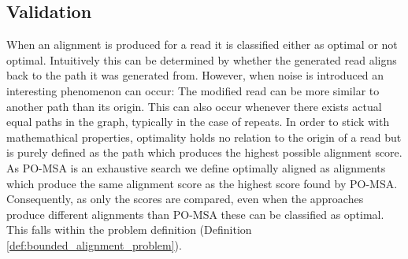 \documentclass[thesis.tex]{subfiles}
\begin{document}
\subsection{Validation}
When an alignment is produced for a read it is classified either as optimal or not optimal. Intuitively this can be determined by whether the generated read aligns back to the path it was generated from. However, when noise is introduced an interesting phenomenon can occur: The modified read can be more similar to another path than its origin. This can also occur whenever there exists actual equal paths in the graph, typically in the case of repeats. In order to stick with mathemathical properties, optimality holds no relation to the origin of a read but is purely defined as the path which produces the highest possible alignment score. As PO-MSA is an exhaustive search we define optimally aligned as alignments which produce the same alignment score as the highest score found by PO-MSA. Consequently, as only the scores are compared, even when the approaches produce different alignments than PO-MSA these can be classified as optimal. This falls within the problem definition (Definition \ref{def:bounded_alignment_problem}).
\end{document}
